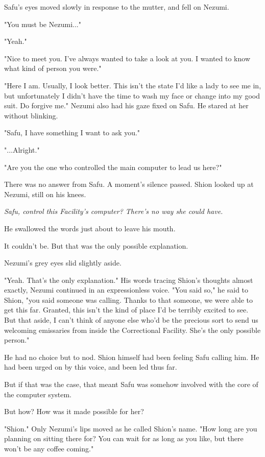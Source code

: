 Safu's eyes moved slowly in response to the mutter, and fell on Nezumi.

"You must be Nezumi..."

"Yeah."

"Nice to meet you. I've always wanted to take a look at you. I wanted to
know what kind of person you were."

"Here I am. Usually, I look better. This isn't the state I'd like a lady
to see me in, but unfortunately I didn't have the time to wash my face
or change into my good suit. Do forgive me." Nezumi also had his gaze
fixed on Safu. He stared at her without blinking.

"Safu, I have something I want to ask you."

"...Alright."

"Are you the one who controlled the main computer to lead us here?"

There was no answer from Safu. A moment's silence passed. Shion looked
up at Nezumi, still on his knees.

\emph{Safu, control this Facility's computer? There's no way she could have.}

He swallowed the words just about to leave his mouth.

It couldn't be. But that was the only possible explanation.

Nezumi's grey eyes slid slightly aside.

"Yeah. That's the only explanation." His words tracing Shion's thoughts
almost exactly, Nezumi continued in an expressionless voice. "You said
so," he said to Shion, "you said someone was calling. Thanks to that
someone, we were able to get this far. Granted, this isn't the kind of
place I'd be terribly excited to see. But that aside, I can't think of
anyone else who'd be the precious sort to send us welcoming emissaries
from inside the Correctional Facility. She's the only possible person."

He had no choice but to nod. Shion himself had been feeling Safu calling
him. He had been urged on by this voice, and been led thus far.

But if that was the case, that meant Safu was somehow involved with the
core of the computer system.

But how? How was it made possible for her?

"Shion." Only Nezumi's lips moved as he called Shion's name. "How long
are you planning on sitting there for? You can wait for as long as you
like, but there won't be any coffee coming."


